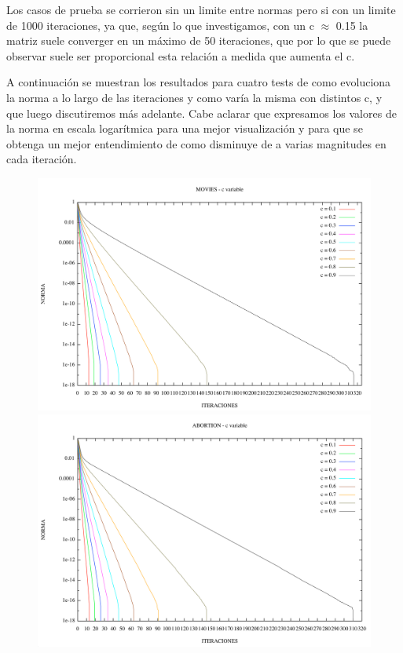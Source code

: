 Los casos de prueba se corrieron sin un limite entre normas pero si con un limite de 1000 iteraciones, ya que, según lo que investigamos, con un c 	$\approx$ 0.15 la matriz suele converger en un máximo de 50 iteraciones, que por lo que se puede observar suele ser proporcional esta relación a medida que aumenta el c.

A continuación se muestran los resultados para cuatro tests de como evoluciona la norma a lo largo de las iteraciones y como varía la misma con distintos c, y que luego discutiremos más adelante.
Cabe aclarar que expresamos los valores de la norma en escala logarítmica para una mejor visualización y para que se obtenga un mejor entendimiento de como disminuye de a varias magnitudes en cada iteración.


\begin{figure}
\begin{center}
       \includegraphics[scale=0.5]{imagenes/pagerank_movies_norma.png}
        \includegraphics[scale=0.5]{imagenes/pagerank_abortion_norma.png}
       \end{center}
\end{figure}


